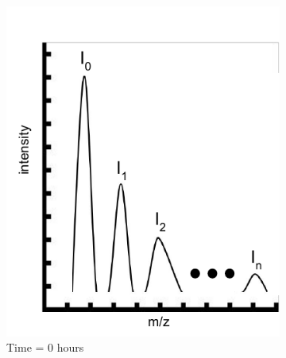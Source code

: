 \documentclass{l4proj}
\begin{document}
\begin{figure}
    \centering
        \begin{subfigure}{0.45\linewidth}
        \includegraphics[width=\linewidth]{dissertation/images/intensities_new_1.pdf}
    \caption{Time = 0 hours}
    \end{subfigure}
      \begin{subfigure}{0.45\linewidth}

\end{subfigure}
\end{figure}
\end{document}
